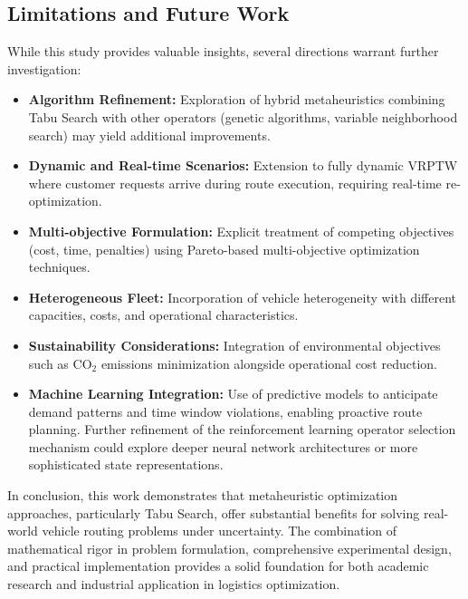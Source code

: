 \subsection{Limitations and Future Work}

While this study provides valuable insights, several directions warrant further investigation:

\begin{itemize}
    \item \textbf{Algorithm Refinement:} Exploration of hybrid metaheuristics combining Tabu Search with other operators (genetic algorithms, variable neighborhood search) may yield additional improvements.
    
    \item \textbf{Dynamic and Real-time Scenarios:} Extension to fully dynamic VRPTW where customer requests arrive during route execution, requiring real-time re-optimization.
    
    \item \textbf{Multi-objective Formulation:} Explicit treatment of competing objectives (cost, time, penalties) using Pareto-based multi-objective optimization techniques.
    
    \item \textbf{Heterogeneous Fleet:} Incorporation of vehicle heterogeneity with different capacities, costs, and operational characteristics.
    
    \item \textbf{Sustainability Considerations:} Integration of environmental objectives such as CO$_2$ emissions minimization alongside operational cost reduction.
    
    \item \textbf{Machine Learning Integration:} Use of predictive models to anticipate demand patterns and time window violations, enabling proactive route planning. Further refinement of the reinforcement learning operator selection mechanism could explore deeper neural network architectures or more sophisticated state representations.
\end{itemize}

In conclusion, this work demonstrates that metaheuristic optimization approaches, particularly Tabu Search, offer substantial benefits for solving real-world vehicle routing problems under uncertainty. The combination of mathematical rigor in problem formulation, comprehensive experimental design, and practical implementation provides a solid foundation for both academic research and industrial application in logistics optimization.